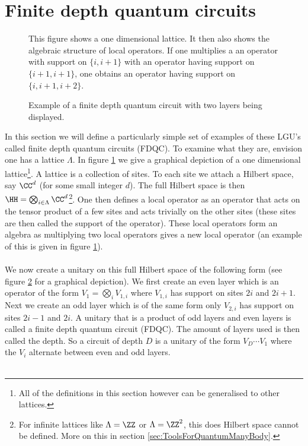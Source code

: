 \section{Finite depth quantum circuits}\label{sec:finite-depth-quantum-circuits}
\begin{figure}
	\centering
	
	\caption{This figure shows a one dimensional lattice. It then also shows the algebraic structure of local operators. If one multiplies a an operator with support on $\{i,i+1\}$ with an operator having support on $\{i+1,i+1\}$, one obtains an operator having support on $\{i,i+1,i+2\}$.}
	\label{fig:Lattice}
\end{figure}
\begin{figure}
	\centering
	
	\caption{Example of a finite depth quantum circuit with two layers being displayed.}
	\label{fig:FiniteDepthQuantumCirquit}
\end{figure}
In this section we will define a particularly simple set of examples of these LGU's called finite depth quantum circuits (FDQC). To examine what they are, envision one has a lattice $\Lambda$. In figure \ref{fig:Lattice} we give a graphical depiction of a one dimensional lattice\footnote{All of the definitions in this section however can be generalised to other lattices.}. A lattice is a collection of sites. To each site we attach a Hilbert space, say $\CC^d$ (for some small integer $d$). The full Hilbert space is then $\HH=\bigotimes_{i\in\Lambda}\CC^d$\footnote{For infinite lattices like $\Lambda=\ZZ$ or $\Lambda=\ZZ^2$, this does Hilbert space cannot be defined. More on this in section \ref{sec:ToolsForQuantumManyBody}.}. One then defines a local operator as an operator that acts on the tensor product of a few sites and acts trivially on the other sites (these sites are then called the support of the operator). These local operators form an algebra as multiplying two local operators gives a new local operator (an example of this is given in figure \ref{fig:Lattice}).\\\\
We now create a unitary on this full Hilbert space of the following form (see figure \ref{fig:FiniteDepthQuantumCirquit} for a graphical depiction). We first create an even layer which is an operator of the form $V_1=\bigotimes_{i}V_{1,i}$ where $V_{1,i}$ has support on sites $2i$ and $2i+1$. Next we create an odd layer which is of the same form only $V_{2,i}$ has support on sites $2i-1$ and $2i$. A unitary that is a product of odd layers and even layers is called a finite depth quantum circuit (FDQC). The amount of layers used is then called the depth. So a circuit of depth $D$ is a unitary of the form $V_D\cdots V_1$ where the $V_i$ alternate between even and odd layers.\\\\
